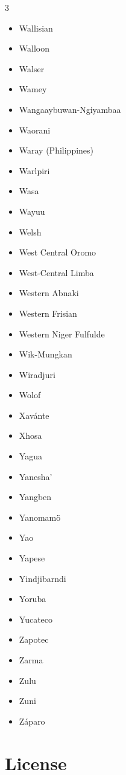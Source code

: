 \documentclass[paper=a4, 10pt]{scrbook}
\begin{document}
\begin{multicols}{3}
\begin{itemize}
        \item Wallisian
        \item Walloon
        \item Walser
        \item Wamey
        \item Wangaaybuwan-Ngiyambaa
        \item Waorani
        \item Waray (Philippines)
        \item Warlpiri
        \item Wasa
        \item Wayuu
        \item Welsh
        \item West Central Oromo
        \item West-Central Limba
        \item Western Abnaki
        \item Western Frisian
        \item Western Niger Fulfulde
        \item Wik-Mungkan
        \item Wiradjuri
        \item Wolof
        \item Xavánte
        \item Xhosa
        \item Yagua
        \item Yanesha’
        \item Yangben
        \item Yanomamö
        \item Yao
        \item Yapese
        \item Yindjibarndi
        \item Yoruba
        \item Yucateco
        \item Zapotec
        \item Zarma
        \item Zulu
        \item Zuni
        \item Záparo
    \end{itemize}
\end{multicols}

\chapter{License}
\end{document}
